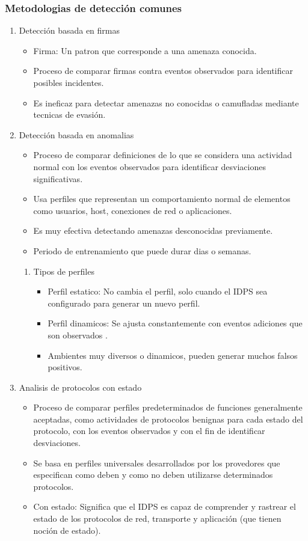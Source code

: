 \documentclass[11pt]{article}
\begin{document}
\subsubsection{Metodologias de detección comunes}
\label{sec:orgfa898fb}
\begin{enumerate}
\item Detección basada en firmas
\label{sec:org6d95627}
\begin{itemize}
\item Firma: Un patron que corresponde a una amenaza conocida.
\item Proceso de comparar firmas contra eventos observados para identificar posibles incidentes.
\item Es ineficaz para detectar amenazas no conocidas o camufladas mediante tecnicas de evasión.
\end{itemize}
\item Detección basada en anomalias
\label{sec:orgf07fd1d}
\begin{itemize}
\item Proceso de comparar definiciones de lo que se considera una actividad normal con los eventos observados para identificar desviaciones significativas.
\item Usa perfiles que representan un comportamiento normal de elementos como usuarios, host, conexiones de red o aplicaciones.
\item Es muy efectiva detectando amenazas desconocidas previamente.
\item Periodo de entrenamiento que puede durar dias o semanas.
\end{itemize}
\begin{enumerate}
\item Tipos de perfiles
\label{sec:orgde2da2e}
\begin{itemize}
\item Perfil estatico: No cambia el perfil, solo cuando el IDPS sea configurado para generar un nuevo perfil.
\item Perfil dinamicos: Se ajusta constantemente con eventos adiciones que son observados .
\item Ambientes muy diversos o dinamicos, pueden generar muchos falsos positivos.
\end{itemize}
\end{enumerate}
\item Analisis de protocolos con estado
\label{sec:org4cfb6a2}
\begin{itemize}
\item Proceso de comparar perfiles predeterminados de funciones generalmente aceptadas, como actividades de protocolos benignas para cada estado del protocolo, con los eventos observados y con el fin de identificar desviaciones.
\item Se basa en perfiles universales desarrollados por los provedores que especifican como deben y como no deben utilizarse determinados protocolos.
\item Con estado: Significa que el IDPS es capaz de comprender y rastrear el estado de los protocolos de red, transporte y aplicación (que tienen noción de estado).


\end{itemize}
\end{enumerate}
\end{document}
